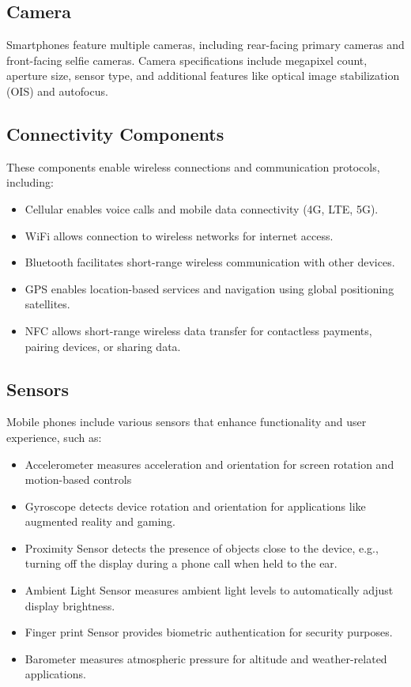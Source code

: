 \documentclass[conference]{IEEEtran}
\begin{document}
\subsection{Camera}
Smartphones feature multiple cameras, including rear-facing
primary cameras and front-facing selfie cameras. Camera
specifications include megapixel count, aperture size, sensor
type, and additional features like optical image stabilization
(OIS) and autofocus.

\subsection{Connectivity Components}
These components enable wireless connections and communication protocols, including:
\begin{itemize}
\item Cellular enables voice calls and mobile data connectivity
(4G, LTE, 5G).
\item WiFi allows connection to wireless networks for internet
access.
\item Bluetooth facilitates short-range wireless communication
with other devices.
\item GPS enables location-based services and navigation using
global positioning satellites.
\item NFC allows short-range wireless data transfer for contactless payments, pairing devices, or sharing data.
\end{itemize}

\subsection{Sensors}
Mobile phones include various sensors that enhance functionality and user experience, such as:

\begin{itemize}
\item Accelerometer measures acceleration and orientation for
screen rotation and motion-based controls
\item Gyroscope detects device rotation and orientation for
applications like augmented reality and gaming.
\item Proximity Sensor detects the presence of objects close to
the device, e.g., turning off the display during a phone
call when held to the ear.
\item Ambient Light Sensor measures ambient light levels to
automatically adjust display brightness.
\item Finger print Sensor provides biometric authentication for
security purposes.
\item Barometer measures atmospheric pressure for altitude and
weather-related applications.
\end{itemize}
\end{document}
